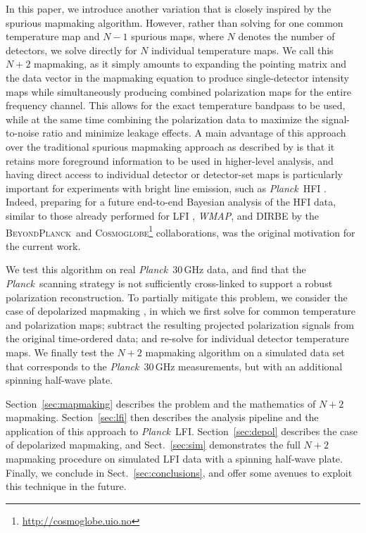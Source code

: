 \documentclass{aa}
\newcommand{\bp}{\textsc{BeyondPlanck}}
\newcommand{\Cosmoglobe}{\textsc{Cosmoglobe}}
\def\Cosmoglobe{\textsc{Cosmoglobe}}
\def\Planck{\textit{Planck}}
\def\WMAP{\textit{WMAP}}
\begin{document}
In this paper, we introduce another variation that is closely inspired by the spurious mapmaking algorithm. However, rather than solving for one common temperature map and $N-1$ spurious maps, where $N$ denotes the number of detectors, we solve directly for $N$ individual temperature maps. We call this $N+2$ mapmaking, as it simply amounts to expanding the pointing matrix and the data vector in the mapmaking equation to produce single-detector intensity maps while simultaneously producing combined polarization maps for the entire frequency channel. This allows for the exact temperature bandpass to be used, while at the same time combining the polarization data to maximize the signal-to-noise ratio and minimize leakage effects. A main advantage of this approach over the traditional spurious mapmaking approach as described by \citet{spurious} is that it retains more foreground information to be used in higher-level analysis, and having direct access to individual detector or detector-set maps is particularly important for experiments with bright line emission, such as \Planck\ HFI \citep{planck_co:2014}. Indeed, preparing for a future end-to-end Bayesian analysis of the HFI data, similar to those already performed for LFI \citep{bp01}, \WMAP \citep{watts2023_dr1}, and DIRBE \citep{CG02_01} by the \bp\ and \Cosmoglobe\footnote{\url{http://cosmoglobe.uio.no}} collaborations, was the original motivation for the current work.  

We test this algorithm on real \Planck\ 30\,GHz data, and find that the \Planck\ scanning strategy is not sufficiently cross-linked to support a robust polarization reconstruction. To partially mitigate this problem, we consider the case of depolarized mapmaking \citep[e.g.,][]{npipe}, in which we first solve for common temperature and polarization maps; subtract the resulting projected polarization signals from the original time-ordered data; and re-solve for individual detector temperature maps. We finally test the $N+2$ mapmaking algorithm on a simulated data set that corresponds to the \Planck\ 30\,GHz measurements, but with an additional spinning half-wave plate.  

Section~\ref{sec:mapmaking} describes the problem and the mathematics of $N+2$ mapmaking. Section~\ref{sec:lfi} then describes the analysis pipeline and the application of this approach to \Planck\ LFI. Section~\ref{sec:depol} describes the case of depolarized mapmaking, and Sect.~\ref{sec:sim} demonstrates the full $N+2$ mapmaking procedure on simulated LFI data with a spinning half-wave plate. Finally, we conclude in Sect.~\ref{sec:conclusions}, and offer some avenues to exploit this technique in the future.
\end{document}
